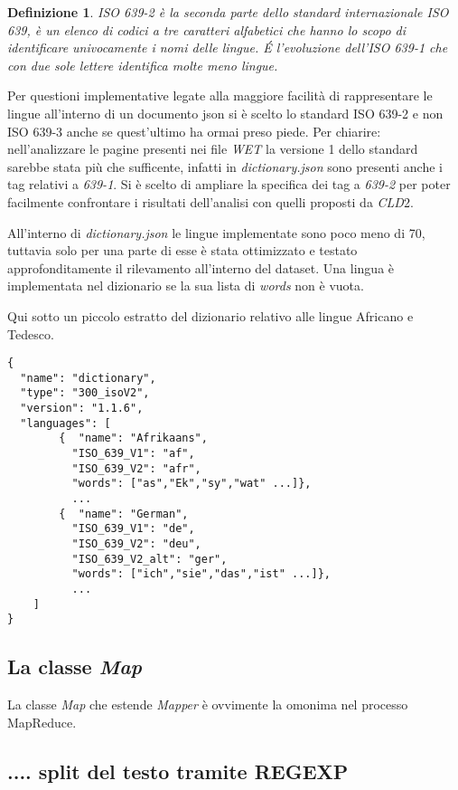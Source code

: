 \documentclass{article}
\newcommand{\MR}{MapReduce}
\newcommand{\cld}{\textit{CLD}2}
\newcommand{\WET}{\textit{WET}}
\newcommand{\filename}[1]{\textit{#1}}
\newtheorem*{definition}{Definizione}
\begin{document}
\begin{definition}
ISO 639-2 è la seconda parte dello standard internazionale ISO 639, è un elenco di codici a tre caratteri alfabetici che hanno lo scopo di identificare univocamente i nomi delle lingue. \'E l'evoluzione dell'ISO 639-1 che con due sole lettere identifica molte meno lingue. 
\end{definition}

Per questioni implementative legate alla maggiore facilità di rappresentare le lingue all'interno di un documento json si è scelto lo standard ISO 639-2 e non ISO 639-3 anche se quest'ultimo ha ormai preso piede. Per chiarire: nell'analizzare le pagine presenti nei file \WET{} la versione 1 dello standard sarebbe stata più che sufficente, infatti in \filename{dictionary.json} sono presenti anche i tag relativi a \textit{639-1}. Si è scelto di ampliare la specifica dei tag a \textit{639-2} per poter facilmente confrontare i risultati dell'analisi con quelli proposti da \cld{}.

All'interno di \filename{dictionary.json} le lingue implementate sono poco meno di 70, tuttavia solo per una parte di esse è stata ottimizzato e testato approfonditamente il rilevamento all'interno del dataset. Una lingua è implementata nel dizionario se la sua lista di \textit{words} non è vuota.

Qui sotto un piccolo estratto del dizionario relativo alle lingue Africano e Tedesco.
\begin{verbatim}
{
  "name": "dictionary",
  "type": "300_isoV2",
  "version": "1.1.6",
  "languages": [
        {  "name": "Afrikaans",
          "ISO_639_V1": "af",
          "ISO_639_V2": "afr",
          "words": ["as","Ek","sy","wat" ...]}, 
          ...
        {  "name": "German",
          "ISO_639_V1": "de",
          "ISO_639_V2": "deu",
          "ISO_639_V2_alt": "ger",
          "words": ["ich","sie","das","ist" ...]}, 
          ...
    ]
}
\end{verbatim}

\subsection{La classe \textit{Map}}
La classe \filename{Map} che estende \filename{Mapper} è ovvimente la omonima nel processo \MR{}.

\subsection{ .... split del testo tramite REGEXP}
\end{document}
